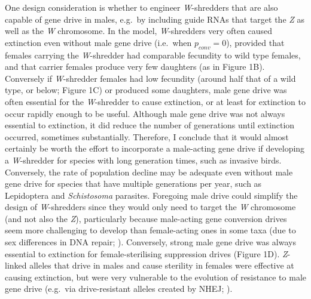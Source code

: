 \documentclass[]{rsos}%
\begin{document}
One design consideration is whether to engineer \emph{W}-shredders that
are also capable of gene drive in males, e.g.~by including guide RNAs
that target the \emph{Z} as well as the \emph{W} chromosome. In the
model, \emph{W}-shredders very often caused extinction even without male
gene drive (i.e.~when \(p_{conv} = 0\)), provided that females carrying
the \emph{W}-shredder had comparable fecundity to wild type females, and
that carrier females produce very few daughters (as in Figure 1B).
Conversely if \emph{W}-shredder females had low fecundity (around half
that of a wild type, or below; Figure 1C) or produced some daughters,
male gene drive was often essential for the \emph{W}-shredder to cause
extinction, or at least for extinction to occur rapidly enough to be
useful. Although male gene drive was not always essential to extinction,
it did reduce the number of generations until extinction occurred,
sometimes substantially. Therefore, I conclude that it would almost
certainly be worth the effort to incorporate a male-acting gene drive if
developing a \emph{W}-shredder for species with long generation times,
such as invasive birds. Conversely, the rate of population decline may
be adequate even without male gene drive for species that have multiple
generations per year, such as Lepidoptera and \emph{Schistosoma}
parasites. Foregoing male drive could simplify the design of
\emph{W}-shredders since they would only need to target the \emph{W}
chromosome (and not also the \emph{Z}), particularly because male-acting
gene conversion drives seem more challenging to develop than
female-acting ones in some taxa (due to sex differences in DNA repair;
\citep{grunwald2019super}). Conversely, strong male gene drive was
always essential to extinction for female-sterilising suppression drives
(Figure 1D). \emph{Z}-linked alleles that drive in males and cause
sterility in females were effective at causing extinction, but were very
vulnerable to the evolution of resistance to male gene drive (e.g.~via
drive-resistant alleles created by NHEJ; \citep{unckless2017ev}).
\end{document}
